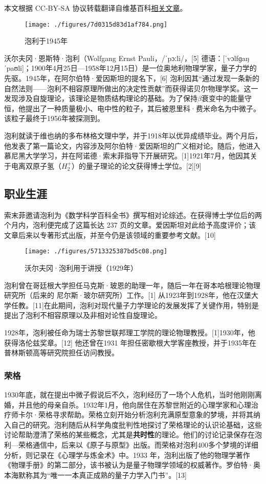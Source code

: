 
本文根据 CC-BY-SA 协议转载翻译自维基百科\href{https://en.wikipedia.org/wiki/Wolfgang_Pauli}{相关文章}。

\begin{figure}[ht]
\centering
\texttt{[image: ./figures/7d0315d83d1af784.png]}
\caption{泡利于1945年} \label{fig_Pauli2_1}
\end{figure}
沃尔夫冈·恩斯特·泡利（Wolfgang Ernst Pauli，/ˈpɔːli/，[5] 德语：[ˈvɔlfɡaŋ ˈpaʊli]；1900年4月25日—1958年12月15日）是一位奥地利物理学家，量子力学的先驱。1945年，在阿尔伯特·爱因斯坦的提名下，[6] 泡利因其“通过发现一条新的自然法则——泡利不相容原理所做出的决定性贡献”而获得诺贝尔物理学奖。这一发现涉及自旋理论，该理论是物质结构理论的基础。为了保持\(\beta\)衰变中的能量守恒，他提出了一种质量极小、电中性的粒子，其后被恩里科·费米命名为中微子。该粒子最终于1956年被探测到。

泡利就读于维也纳的多布林格文理中学，并于1918年以优异成绩毕业。两个月后，他发表了第一篇论文，内容涉及阿尔伯特·爱因斯坦的广义相对论。随后，他进入慕尼黑大学学习，并在阿诺德·索末菲指导下开展研究。[1]1921年7月，他因其关于电离双原子氢（\(H_2^+\)）的量子理论的论文获得博士学位。[2][9]
\subsection{职业生涯}  
索末菲邀请泡利为《数学科学百科全书》撰写相对论综述。在获得博士学位后的两个月内，泡利便完成了这篇长达 237 页的文章。爱因斯坦对此给予高度评价；该文章后来以专著形式出版，并至今仍是该领域的重要参考文献。[10]
\begin{figure}[ht]
\centering
\texttt{[image: ./figures/5713325387bd5c08.png]}
\caption{沃尔夫冈·泡利用于讲授（1929年）} \label{fig_Pauli2_2}
\end{figure}
泡利曾在哥廷根大学担任马克斯·玻恩的助理一年，随后一年在哥本哈根理论物理研究所（后来的 尼尔斯·玻尔研究所）工作。[1] 从1923年到1928年，他在汉堡大学任教。[11]在此期间，泡利对现代量子力学理论的发展发挥了关键作用，特别是提出了泡利不相容原理以及非相对论性自旋理论。

1928年，泡利被任命为瑞士苏黎世联邦理工学院的理论物理教授。[1]1930年，他获得洛伦兹奖章。[12] 他还曾在1931 年担任密歇根大学客座教授，并于1935年在普林斯顿高等研究院担任访问教授。
\subsubsection{荣格}  
1930年底，就在提出中微子假说后不久，泡利经历了一场个人危机，当时他刚刚离婚，并且他的母亲自杀。1932年1月，他向居住在苏黎世附近的心理学家和心理治疗师卡尔·荣格寻求帮助。荣格立刻开始分析泡利充满原型意象的梦境，并将其纳入自己的研究。泡利随后从科学角度批判性地探讨了荣格理论的认识论基础，这些讨论帮助澄清了荣格的某些概念，尤其是\textbf{共时性}的理论。他们的讨论记录保存在泡利—荣格通信中，后来以《原子与原型》出版。而荣格对泡利400多个梦境的详细分析，则记录在《心理学与炼金术》中。1933 年，泡利出版了他的物理学著作《物理手册》的第二部分，该书被认为是量子物理学领域的权威著作。罗伯特·奥本海默称其为“唯一一本真正成熟的量子力学入门书”。[13]

